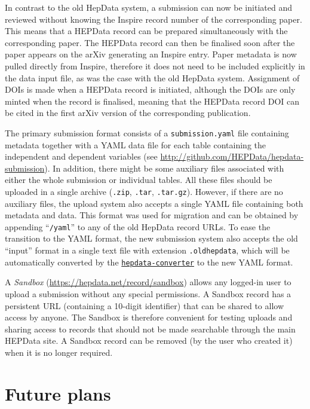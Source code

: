 \documentclass[a4paper]{jpconf}
\begin{document}
In contrast to the old HepData system, a submission can now be initiated and
reviewed without knowing the Inspire record number of the corresponding paper.
 This means that a HEPData record can be prepared simultaneously with the
corresponding paper.  The HEPData record can then be finalised soon after the
paper appears on the arXiv generating an Inspire entry.  Paper metadata is now
pulled directly from Inspire, therefore it does not need to be included
explicitly in the data input file, as was the case with the old HepData system.
 Assignment of DOIs is made when a HEPData record is initiated, although the 
DOIs are only minted when the record is finalised, meaning that the HEPData
record DOI can be cited in the first arXiv version of the corresponding
publication.

The primary submission format consists of a \texttt{submission.yaml} file
containing metadata together with a YAML data file for each table containing
the independent and dependent variables (see
\url{http://github.com/HEPData/hepdata-submission}).  In addition, there might
be some auxiliary files associated with either the whole submission or
individual tables.  All these files should be uploaded in a single archive
(\texttt{.zip}, \texttt{.tar}, \texttt{.tar.gz}).  However, if there are no
auxiliary files, the upload system also accepts a single YAML file containing
both metadata and data.  This format was used for migration and can be obtained
by appending ``\texttt{/yaml}'' to any of the old HepData record URLs.  To ease
the transition to the YAML format, the new submission system also accepts the
old ``input'' format in a single text file with extension \texttt{.oldhepdata},
which will be automatically converted by the
\href{https://github.com/HEPData/hepdata-converter}{\texttt{hepdata-converter}}
to the new YAML format.

A \emph{Sandbox} (\url{https://hepdata.net/record/sandbox}) allows any
logged-in user to upload a submission without any special permissions.  A
Sandbox record has a persistent URL (containing a 10-digit identifier) that can
be shared to allow access by anyone.  The Sandbox is therefore convenient for
testing uploads and sharing access to records that should not be made
searchable through the main HEPData site.  A Sandbox record can be removed (by
the user who created it) when it is no longer required.

\section{Future plans}
\end{document}
